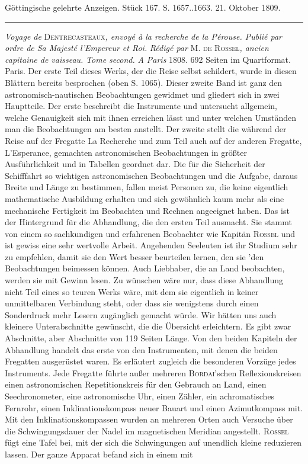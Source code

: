 \clearpage
{}
\hypertarget{native-519-lower}{}\label{native-519-lower}
\begin{center}\small Göttingische gelehrte Anzeigen. Stück 167. S. 1657..1663. 21. Oktober 1809.\\[3pt]\rule{.72\linewidth}{.3pt}\end{center}

\emph{Voyage de} \textsc{Dentrecasteaux}\emph{, envoyé à la recherche de la Pérouse. Publié par ordre de Sa Majesté l'Empereur et Roi.} \emph{Rédigé par} M. \textsc{de Rossel}\emph{, ancien capitaine de vaisseau.} \emph{Tome second.} \emph{A Paris} 1808. 692 Seiten im Quartformat. Paris. Der erste Teil dieses Werks, der die Reise selbst schildert, wurde in diesen Blättern bereits besprochen (oben S. 1065). Dieser zweite Band ist ganz den astronomisch-nautischen Beobachtungen gewidmet und gliedert sich in zwei Hauptteile. Der erste beschreibt die Instrumente und untersucht allgemein, welche Genauigkeit sich mit ihnen erreichen lässt und unter welchen Umständen man die Beobachtungen am besten anstellt. Der zweite stellt die während der Reise auf der Fregatte La Recherche und zum Teil auch auf der anderen Fregatte, L'Esperance, gemachten astronomischen Beobachtungen in größter Ausführlichkeit und in Tabellen geordnet dar. Die für die Sicherheit der Schifffahrt so wichtigen astronomischen Beobachtungen und die Aufgabe, daraus Breite und Länge zu bestimmen, fallen meist Personen zu, die keine eigentlich mathematische Ausbildung erhalten und sich gewöhnlich kaum mehr als eine mechanische Fertigkeit im Beobachten und Rechnen angeeignet haben. Das ist der Hintergrund für die Abhandlung, die den ersten Teil ausmacht. Sie stammt von einem so sachkundigen und erfahrenen Beobachter wie Kapitän \textsc{Rossel} und ist gewiss eine sehr wertvolle Arbeit. Angehenden Seeleuten ist ihr Studium sehr zu empfehlen, damit sie den Wert besser beurteilen lernen, den sie 'den Beobachtungen beimessen können. Auch Liebhaber, die an Land beobachten, werden sie mit Gewinn lesen. Zu wünschen wäre nur, dass diese Abhandlung nicht Teil eines so teuren Werks wäre, mit dem sie eigentlich in keiner unmittelbaren Verbindung steht, oder dass sie wenigstens durch einen Sonderdruck mehr Lesern zugänglich gemacht würde. Wir hätten uns auch kleinere Unterabschnitte gewünscht, die die Übersicht erleichtern. Es gibt zwar Abschnitte, aber Abschnitte von 119 Seiten Länge. Von den beiden Kapiteln der Abhandlung handelt das erste von den Instrumenten, mit denen die beiden Fregatten ausgerüstet waren. Es erläutert zugleich die besonderen Vorzüge jedes Instruments. Jede Fregatte führte außer mehreren \textsc{Bordai}'schen Reflexionskreisen einen astronomischen Repetitionskreis für den Gebrauch an Land, einen Seechronometer, eine astronomische Uhr, einen Zähler, ein achromatisches Fernrohr, einen Inklinationskompass neuer Bauart und einen Azimutkompass mit. Mit den Inklinationskompassen wurden an mehreren Orten auch Versuche über die Schwingungsdauer der Nadel im magnetischen Meridian angestellt. \textsc{Rossel} fügt eine Tafel bei, mit der sich die Schwingungen auf unendlich kleine reduzieren lassen. Der ganze Apparat befand sich in einem mit 